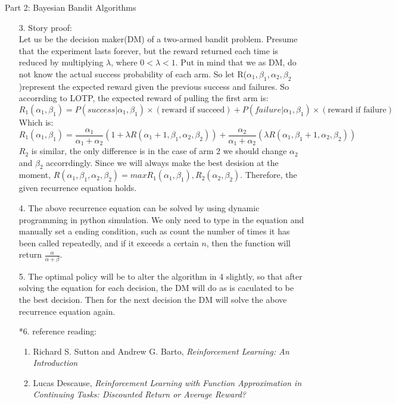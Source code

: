 \documentclass{article}
\begin{document}
\begin{homeworkProblem}{Part 2: Bayesian Bandit Algorithms}
\begin{enumerate}
        \item[3.]
        Story proof:\\
        Let us be the decision maker(DM) of a two-armed bandit problem. Presume that the experiment lasts forever, 
        but the reward returned each time is reduced by multiplying $\lambda$, where $0<\lambda<1$. Put in mind that we as DM, 
        do not know the actual success probability of each arm. So let R($\alpha_1,\beta_1,\alpha_2,\beta_2$)represent the expected reward given the previous success and failures.
        So accorrding to LOTP, the expected reward of pulling the first arm is:
        $$R_1(\alpha_1,\beta_1) = P(success|\alpha_1,\beta_1)\times(\text{reward if succeed})+P(failure|\alpha_1,\beta_1)\times(\text{reward if failure})$$
        Which is:
        $$R_1(\alpha_1,\beta_1) = \frac{\alpha_1}{\alpha_1+\alpha_2}(1+\lambda R(\alpha_1+1,\beta_1,\alpha_2,\beta_2))+\frac{\alpha_2}{\alpha_1+\alpha_2}(\lambda R(\alpha_1,\beta_1+1,\alpha_2,\beta_2))$$
        $R_2$ is similar, the only difference is in the case of arm 2 we should change $\alpha_2$ and $\beta_2$ accorrdingly.
        Since we will always make the best desision at the moment, $R(\alpha_1,\beta_1,\alpha_2,\beta_2) = max{R_1(\alpha_1,\beta_1),R_2(\alpha_2,\beta_2)}$.
        Therefore, the given recurrence equation holds.
        \item[4.]
        The above recurrence equation can be solved by using dynamic programming in python simulation. We only need to type in the equation and manually set a ending condition,
        such as count the number of times it has been called repeatedly, and if it exceeds a certain $n$, then the function will return $\frac{\alpha}{\alpha+\beta}$.
        \item[5.]
        The optimal policy will be to alter the algorithm in 4 slightly, so that after solving the equation for each decision, the DM will do as is caculated to be the best decision.
        Then for the next decision the DM will solve the above recurrence equation again.
        \item[*6.] reference reading:
        \begin{enumerate}[1]
            \item Richard S. Sutton and Andrew G. Barto, \textsl{Reinforcement Learning: An Introduction}
            \item Lucas Descause, \textsl{Reinforcement Learning with Function Approximation in Continuing Tasks: Discounted Return or Average Reward?}
        \end{enumerate}
    \end{enumerate}
\end{homeworkProblem}
\end{document}
